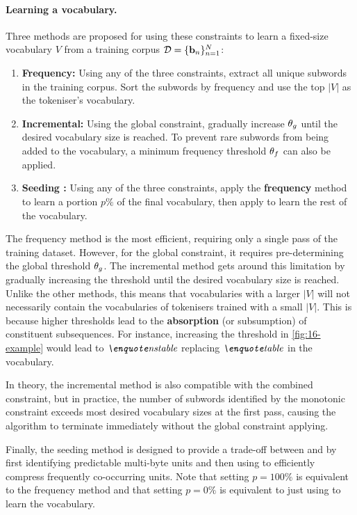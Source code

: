 \paragraph{Learning a vocabulary.} Three methods are proposed for using these constraints to learn a fixed-size vocabulary \(V\) from a training corpus $\mathcal{D} = \{\mathbf{b}_n\}_{n=1}^N$:
\begin{enumerate}
    \item \textbf{Frequency:} Using any of the three constraints, extract all unique subwords in the training corpus. Sort the subwords by frequency and use the top \(|V|\) as the tokeniser's vocabulary.
    \item \textbf{Incremental:} Using the global constraint, gradually increase $\theta_g$ until the desired vocabulary size is reached. To prevent rare subwords from being added to the vocabulary, a minimum frequency threshold $\theta_f$ can also be applied.
    \item \textbf{Seeding \bpe:} Using any of the three constraints, apply the \textbf{frequency} method to learn a portion $p\%$ of the final vocabulary, then apply \bpe to learn the rest of the vocabulary. 
\end{enumerate}

The frequency method is the most efficient, requiring only a single pass of the training dataset. However, for the global constraint, it requires pre-determining the global threshold $\theta_g$. The incremental method gets around this limitation by gradually increasing the threshold until the desired vocabulary size is reached. Unlike the other methods, this means that vocabularies with a larger \(|V|\) will not necessarily contain the vocabularies of tokenisers trained with a small \(|V|\). This is because higher thresholds lead to the \textbf{absorption} (or subsumption) of constituent subsequences. For instance, increasing the threshold in \cref{fig:16-example} would lead to $\ex{nstable}$ replacing $\ex{table}$ in the vocabulary.

In theory, the incremental method is also compatible with the combined constraint, but in practice, the number of subwords identified by the monotonic constraint exceeds most desired vocabulary sizes at the first pass, causing the algorithm to terminate immediately without the global constraint applying.

Finally, the seeding method is designed to provide a trade-off between \bytespan and \bpe by first identifying predictable multi-byte units and then using \bpe to efficiently compress frequently co-occurring units. Note that setting $p=100\%$ is equivalent to the frequency method and that setting  $p=0\%$ is equivalent to just using \bpe to learn the vocabulary.

